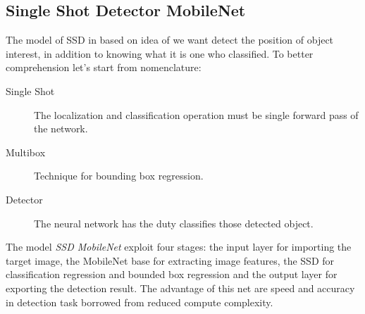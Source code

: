 \subsection{Single Shot Detector MobileNet}
\label{ssec:single-shot-detector}
The model of SSD in based on idea of we want detect the position of object
interest, in addition to knowing what it is one who classified. To better
comprehension let's start from nomenclature:
\begin{description}
\item[Single Shot] The localization and classification operation must be single forward pass of the network.
\item[Multibox] Technique for bounding box regression.
\item[Detector] The neural network has the duty classifies those detected object.
\end{description}
%
The model \emph{SSD MobileNet} exploit four stages: the input layer for
importing the target image, the MobileNet base for extracting image features,
the SSD for classification regression and bounded box regression and the output
layer for exporting the detection result.\cite{Li_2018} 
The advantage of this net are speed and accuracy in detection task borrowed from
reduced compute complexity.
%
%
